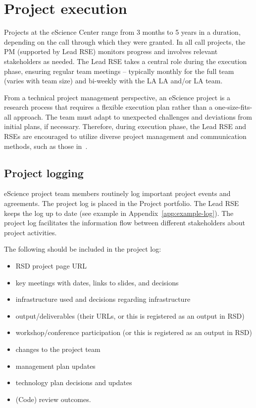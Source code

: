 \section{Project execution}
Projects at the eScience Center range from 3 months to 5 years in a duration, depending on the call through which they were
granted. In all call projects, the PM (supported by Lead RSE) monitors progress and involves relevant stakeholders as needed. 
The Lead RSE takes a central role during the execution phase, ensuring regular team meetings -- typically monthly for the full team (varies with team size) 
and bi-weekly with the LA LA and/or LA team.

From a technical project management perspective, an eScience project is a research process that requires a flexible execution plan rather than a one-size-fits-all approach.
The team must adapt to unexpected challenges and deviations from initial plans, if necessary. Therefore, 
during execution phase, the Lead RSE and RSEs are encouraged to utilize diverse project management and communication methods, 
such as those in~\cite{the_turing_way-2023,microp3,scrum-guide}.


\subsection{Project logging}
\label{sec:exec:log}
eScience project team members routinely log important project events and agreements. The project log is placed in the
Project portfolio. The Lead RSE keeps the log up to
date (see example in Appendix~\ref{app:example-log}). The project log facilitates the information flow between
different stakeholders about project activities.

The following should be included in the project log:
\begin{itemize}[itemsep=-4pt,parsep=4pt]
\item RSD project page URL
\item key meetings with dates, links to slides, and decisions
\item infrastructure used and decisions regarding infrastructure
\item output/deliverables (their URLs, or this is registered as an output in RSD)
\item workshop/conference participation (or this is registered as an output in RSD)
\item changes to the project team
\item management plan updates
\item technology plan decisions and updates
\item (Code) review outcomes.
\end{itemize}

